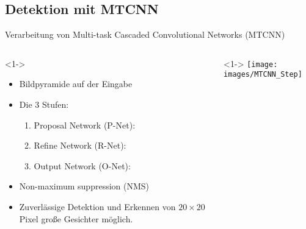 \subsection{Detektion mit MTCNN}
\begin{frame}
Verarbeitung von Multi-task Cascaded Convolutional Networks (MTCNN)
\begin{columns}
	\begin{column}{0.59\linewidth}<1->
\begin{itemize}
	\item<1-> Bildpyramide auf der Eingabe
	\item<1-> Die 3 Stufen:
	\begin{enumerate}
		\item<1-> Proposal Network (P-Net):
		\item<1-> Refine Network (R-Net):
		\item<1-> Output Network (O-Net):
	\end{enumerate}
	\item<1-> Non-maximum suppression (NMS)
	\item<1-> Zuverlässige Detektion und Erkennen von $20\times 20$ Pixel große Gesichter möglich.
\end{itemize}
	\end{column}
	\begin{column}{0.41\linewidth}<1->
		\centering
		\texttt{[image: images/MTCNN\_Step]}
	\end{column}
\end{columns}
\end{frame}
